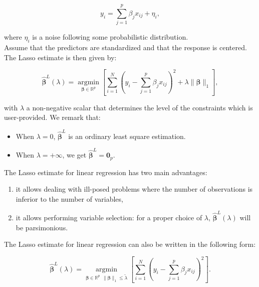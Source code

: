\documentclass[a4paper]{article}
\renewcommand{\leq}{\leqslant}
\begin{document}
\begin{equation}
 y_i= \sum_{j=1}^{p} {\beta}_j  x_{ij} + \eta_i,
\end{equation}

where $\eta_i$ is a noise following some probabilistic distribution.\\

Assume that the predictors are standardized and that the response is centered. The Lasso estimate is then given by:

\begin{equation}\label{lasso1}
\hat{\boldsymbol{\beta}}^L(\lambda)=\underset{{\boldsymbol{\beta}} \in \mathbb{R}^p}{\operatorname{argmin}} \left[ \sum_{i=1}^{N} \left(y_i- \sum_{j=1}^{p} {\beta}_j  x_{ij}\right)^2 +  \lambda \| \boldsymbol{\beta}\|_1\right],
\end{equation}

with $\lambda$ a non-negative scalar that determines the level of the constraints which is user-provided. We remark that:

\begin{itemize}
\item When $\lambda = 0$, $\hat{\boldsymbol{\beta}}^L$ is an ordinary least square estimation.
\item When $\lambda = +\infty$, we get $\hat{\boldsymbol{\beta}}^L = \boldsymbol{0}_p$.
\end{itemize}

The Lasso estimate for linear regression has two main advantages: 

\begin{enumerate}
\item it allows dealing with ill-posed problems where the number of observations is inferior to the number of variables,
\item it allows performing variable selection: for a proper choice of $\lambda$, $\hat{\boldsymbol{\beta}}^L(\lambda)$ will be parsimonious. \\
\end{enumerate}

The Lasso estimate for linear regression can also be written in the following form: 

\begin{equation}\label{lasso2}
\hat{\boldsymbol{\beta}}^L(\lambda)=\underset{{\boldsymbol{\beta}} \in \mathbb{R}^p ~~ \| \boldsymbol{\beta}\|_1 \leq \tilde{\lambda}}{\operatorname{argmin} } \left[ \sum_{i=1}^{N} \left(y_i- \sum_{j=1}^{p} {\beta}_j  x_{ij}\right)^2 \right].
\end{equation}
\end{document}
